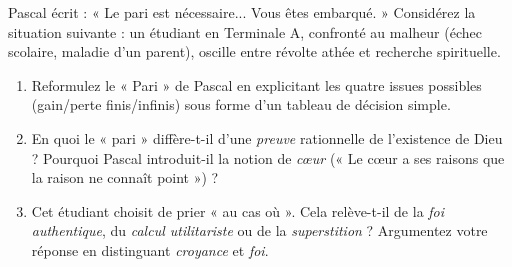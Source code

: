 \documentclass[11pt]{article}
\begin{document}
\begin{exercice}
Pascal écrit : « Le pari est nécessaire... Vous êtes embarqué. » Considérez la situation suivante : un étudiant en Terminale A, confronté au malheur (échec scolaire, maladie d'un parent), oscille entre révolte athée et recherche spirituelle.

\begin{enumerate}
    \item Reformulez le « Pari » de Pascal en explicitant les quatre issues possibles (gain/perte finis/infinis) sous forme d'un tableau de décision simple.
    \item En quoi le « pari » diffère-t-il d'une \textit{preuve} rationnelle de l'existence de Dieu ? Pourquoi Pascal introduit-il la notion de \textit{cœur} (« Le cœur a ses raisons que la raison ne connaît point ») ?
    \item Cet étudiant choisit de prier « au cas où ». Cela relève-t-il de la \textit{foi authentique}, du \textit{calcul utilitariste} ou de la \textit{superstition} ? Argumentez votre réponse en distinguant \textit{croyance} et \textit{foi}.
\end{enumerate}
\end{exercice}
\end{document}
